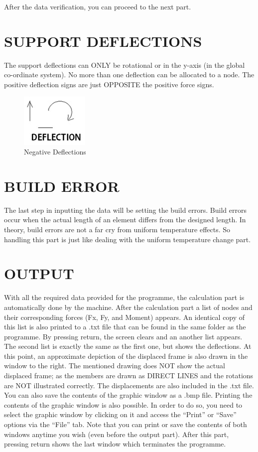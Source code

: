 \documentclass{article}
\begin{document}
 After the data verification, you can proceed to the next part.
 \section{SUPPORT DEFLECTIONS }
 The support deflections can ONLY be rotational or in the y-axis (in the global co-ordinate system). No more than one deflection can be allocated to a node. The positive deflection signs are just OPPOSITE the positive force signs.
  \begin{figure}
\centering
 \includegraphics{ndef.jpg}
 \caption{Negative Deflections}
 \label{p3}
 \end{figure}
 \section{BUILD ERROR}
 The last step in inputting the data will be setting the build errors. Build errors occur when the actual length of an element differs from the designed length. In theory, build errors are not a far cry from uniform temperature effects. So handling this part is just like dealing with the uniform temperature change part.
 \section{OUTPUT}
 With all the required data provided for the programme, the calculation part is automatically done by the machine. After the calculation part a list of nodes and their corresponding forces (Fx, Fy, and Moment) appears. An identical copy of this list is also printed to a .txt file that can be found in the same folder as the programme. By pressing return, the screen clears and an another list appears. The second list is exactly the same as the first one, but shows the deflections. At this point, an approximate depiction of the displaced frame is also drawn in the window to the right. The mentioned drawing does NOT show the actual displaced frame; as the members are drawn as DIRECT LINES and the rotations are NOT illustrated correctly. The displacements are also included in the .txt file.
You can also save the contents of the graphic window as a .bmp file. Printing the contents of the graphic window is also possible. In order to do so, you need to select the graphic window by clicking on it and access the “Print” or “Save” options via the “File” tab. 
Note that you can print or save the contents of both windows anytime you wish (even before the output part).
After this part, pressing return shows the last window which terminates the programme.
\end{document}
